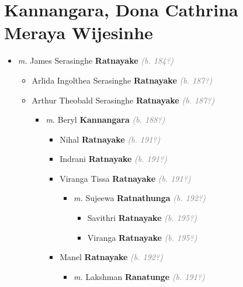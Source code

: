\documentclass[10pt, openany]{book}
\begin{document}
\chapter{Kannangara, Dona Cathrina Meraya Wijesinhe}
\label{00000414}
\textcolor{slmaroon}{\textit{}}
\begin{itemize}
\item{\textit{m.} James Serasinghe \textbf{Ratnayake} \textcolor{gray}{\textit{(b. 184?)}}   \label{couple:00000414:00000651} \begin{itemize}
\item{Arlida Ingolthea Serasinghe \textbf{Ratnayake} \textcolor{gray}{\textit{(b. 187?)}}
   }
\item{Arthur Theobald Serasinghe \textbf{Ratnayake} \textcolor{gray}{\textit{(b. 187?)}}
\begin{itemize}
\item{\textit{m.} Beryl \textbf{Kannangara} \textcolor{gray}{\textit{(b. 188?)}}   \label{couple:00000389:00000646} \begin{itemize}
\item{Nihal \textbf{Ratnayake} \textcolor{gray}{\textit{(b. 191?)}}
 }
\item{Indrani \textbf{Ratnayake} \textcolor{gray}{\textit{(b. 191?)}}
 }
\item{Viranga Tissa \textbf{Ratnayake} \textcolor{gray}{\textit{(b. 191?)}}
\begin{itemize}
\item{\textit{m.} Sujeewa \textbf{Ratnathunga} \textcolor{gray}{\textit{(b. 192?)}}   \label{couple:00000640:00000660} \begin{itemize}
\item{Savithri \textbf{Ratnayake} \textcolor{gray}{\textit{(b. 195?)}}
 }
\item{Viranga \textbf{Ratnayake} \textcolor{gray}{\textit{(b. 195?)}}
 }
\end{itemize}}
\end{itemize}
  }
\item{Manel \textbf{Ratnayake} \textcolor{gray}{\textit{(b. 192?)}}
\begin{itemize}
\item{\textit{m.} Lakshman \textbf{Ranatunge} \textcolor{gray}{\textit{(b. 191?)}}   \label{couple:00000637:00000652} \begin{itemize}

\end{itemize}}
\end{itemize}}
\end{itemize}}
\end{itemize}}
\end{itemize}}
\end{itemize}
\end{document}
